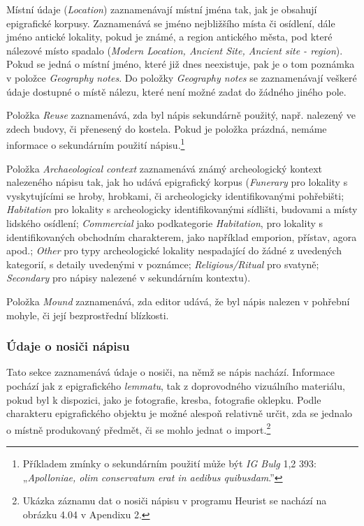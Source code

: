 \startitemize
\item
  \startblockquote
  Místní údaje ({\em Location}) zaznamenávají místní jména tak, jak je obsahují epigrafické korpusy. Zaznamenává se jméno nejbližšího místa či osídlení, dále jméno antické lokality, pokud je známé, a region antického města, pod které nálezové místo spadalo ({\em Modern Location, Ancient Site, Ancient site - region}). Pokud se jedná o místní jméno, které již dnes neexistuje, pak je o tom poznámka v položce {\em Geography notes}. Do položky {\em Geography notes} se zaznamenávají veškeré údaje dostupné o místě nálezu, které není možné zadat do žádného jiného pole.
  \stopblockquote
\item
  \startblockquote
  Položka {\em Reuse} zaznamenává, zda byl nápis sekundárně použitý, např. nalezený ve zdech budovy, či přenesený do kostela. Pokud je položka prázdná, nemáme informace o sekundárním použití nápisu.\footnote{Příkladem zmínky o sekundárním použití může být {\em IG Bulg} 1,2 393: „{\em Apolloniae, olim conservatum erat in aedibus quibusdam}.”}
  \stopblockquote
\item
  \startblockquote
  Položka {\em Archaeological context} zaznamenává známý archeologický kontext nalezeného nápisu tak, jak ho udává epigrafický korpus ({\em Funerary} pro lokality s vyskytujícími se hroby, hrobkami, či archeologicky identifikovanými pohřebišti; {\em Habitation} pro lokality s archeologicky identifikovanými sídlišti, budovami a místy lidského osídlení; {\em Commercial} jako podkategorie {\em Habitation}, pro lokality s identifikovaných obchodním charakterem, jako například emporion, přístav, agora apod.; {\em Other} pro typy archeologické lokality nespadající do žádné z uvedených kategorií, s detaily uvedenými v poznámce; {\em Religious/Ritual} pro svatyně; {\em Secondary} pro nápisy nalezené v sekundárním kontextu).
  \stopblockquote
\item
  \startblockquote
  Položka {\em Mound} zaznamenává, zda editor udává, že byl nápis nalezen v pohřební mohyle, či její bezprostřední blízkosti.
  \stopblockquote
\stopitemize

\subsubsection[údaje-o-nosiči-nápisu]{Údaje o nosiči nápisu}

Tato sekce zaznamenává údaje o nosiči, na němž se nápis nachází. Informace pochází jak z epigrafického {\em lemmatu}, tak z doprovodného vizuálního materiálu, pokud byl k dispozici, jako je fotografie, kresba, fotografie oklepku. Podle charakteru epigrafického objektu je možné alespoň relativně určit, zda se jednalo o místně produkovaný předmět, či se mohlo jednat o import.\footnote{Ukázka záznamu dat o nosiči nápisu v programu Heurist se nachází na obrázku 4.04 v Apendixu 2.}

